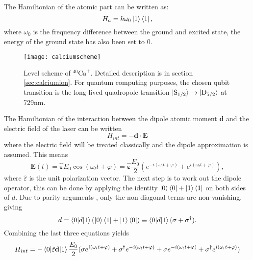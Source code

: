 The Hamiltonian of the atomic part can be written as:
\begin{equation}
H_a = \hbar\omega_0 \ket{1}\bra{1},
\end{equation}
where $\omega_0$ is the frequency difference between the ground and excited state, the energy of the ground state has also been set to 0. \begin{figure}
\centering
\texttt{[image: calciumscheme]}
\caption{Level scheme of $^{40}\text{Ca}^+$. Detailed description is in section \ref{sec:calciumion}. For quantum computing purposes, the chosen qubit transition is the long lived quadropole transition $\ket{\text{S}_{1/2}} \to \ket{\text{D}_{5/2}}$ at 729nm.}
\label{qubitschemereference}
\end{figure}
The Hamiltonian of the interaction between the dipole atomic moment $\mathbf{d}$ and the electric field of the laser can be written \cite{steck}
\begin{equation}
H_{int} = -\mathbf{d}\cdot \mathbf{E}
\end{equation}
where the electric field will be treated classically and the dipole approximation is assumed. This means
\begin{equation}
\mathbf{E}(t) = \hat{\mathbf{\varepsilon}} E_0 \cos(\omega_l t+\varphi) = \hat{\mathbf{\varepsilon}} \frac{E_0}{2} \left(e^{-i(\omega_l t+\varphi)} + e^{i(\omega_l t+\varphi)}\right),
\end{equation}
where $\hat{\varepsilon}$ is the unit polarization vector. The next step is to work out the dipole operator, this can be done by applying the identity $\ket{0}\bra{0} + \ket{1}\bra{1}$ on both sides of $d$. Due to parity arguments \cite{steck}, only the non diagonal terms are non-vanishing, giving
\begin{equation}
d = \braket{0|d|1}\left(\ket{0}\bra{1} + \ket{1}\bra{0}\right) \equiv \braket{0|d|1}(\sigma + \sigma^\dagger).
\end{equation}
Combining the last three equations yields
\begin{equation}
\label{eq:hint}
H_{int} = - \braket{0|\hat{\varepsilon} \mathbf{d}|1}\frac{E_0}{2}(\sigma e^{i(\omega_l t+\varphi)} + \sigma^\dagger e^{-i(\omega_l t+\varphi)} + \sigma e^{-i(\omega_l t+\varphi)} + \sigma^\dagger e^{i(\omega_l t+\varphi)})
\end{equation}
